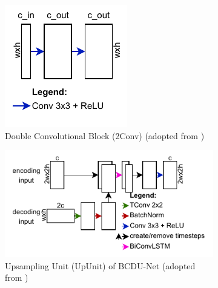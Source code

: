 \documentclass{article}
\begin{document}
\begin{figure}
	\centering
	\begin{subfigure}[b]{0.25\textwidth}
		\includegraphics[width=\textwidth]{2ConvBlock}
		\caption{Double Convolutional Block (2Conv) (adopted from 
			\autocite[4]{BCDUNet})}
		\label{fig:2conv}
	\end{subfigure}
	\hfill
	\begin{subfigure}[b]{0.6\textwidth}
		\includegraphics[width=\textwidth]{UpUnit}
		\caption{Upsampling Unit (UpUnit) of BCDU-Net (adopted from 
			\autocite[4]{BCDUNet})}
		\label{fig:upunit}
	\end{subfigure}
	\hfill
	\begin{subfigure}[b]{0.75\textwidth}

\end{subfigure}
\end{figure}
\end{document}
